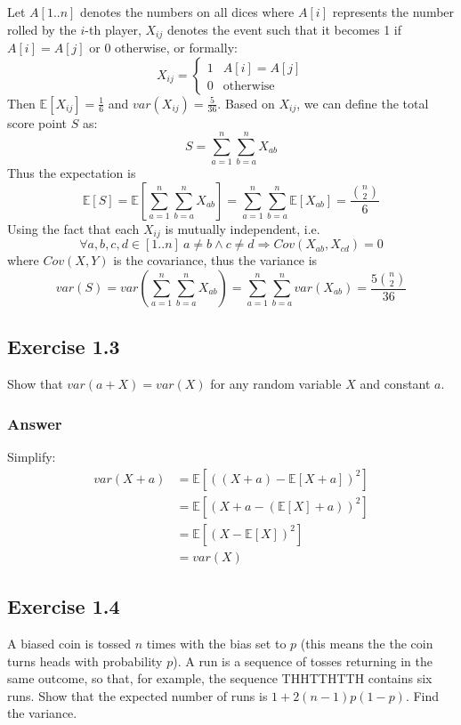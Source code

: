 \documentclass[a4paper]{article}
\newcommand{\Expected}[1]{\mathbb{E}[#1]}
\begin{document}
Let $A[1..n]$ denotes the numbers on all dices where $A[i]$ represents the number rolled by the $i$-th player, $X_{ij}$ denotes the event such that it becomes 1 if $A[i]=A[j]$ or 0 otherwise, or formally:
\[
X_{ij} =
\begin{cases}
1 & A[i] = A[j] \\
0 & \text{otherwise}
\end{cases}
\]
Then $\Expected{X_{ij}}=\frac{1}{6}$ and $var(X_{ij}) = \frac{5}{36}$. Based on $X_{ij}$, we can define the total score point $S$ as:
$$S = \sum_{a=1}^{n}\sum_{b=a}^{n}X_{ab}$$
Thus the expectation is
$$\Expected{S} = \Expected{\sum_{a=1}^{n}\sum_{b=a}^{n}X_{ab}} = \sum_{a=1}^{n}\sum_{b=a}^{n}\Expected{X_{ab}} = \frac{\binom{n}{2}}{6}$$
Using the fact that each $X_{ij}$ is mutually independent, i.e.
$$\forall a,b,c,d \in [1..n]\ a \neq b \wedge c \neq d \Rightarrow Cov(X_{ab}, X_{cd}) = 0$$
where $Cov(X, Y)$ is the covariance, thus the variance is
$$var(S) = var(\sum_{a=1}^{n}\sum_{b=a}^{n}X_{ab}) = \sum_{a=1}^{n}\sum_{b=a}^{n}var(X_{ab}) = \frac{5\binom{n}{2}}{36}$$

\subsection{Exercise 1.3}

Show that $var(a+X) = var(X)$ for any random variable $X$ and constant $a$.

\subsubsection{Answer}

Simplify:
\begin{equation*}
\begin{split}
var(X+a) & = \Expected{((X+a)-\Expected{X+a})^2} \\
& = \Expected{(X+a-(\Expected{X}+a))^2} \\
& = \Expected{(X-\Expected{X})^2} \\
& = var(X)
\end{split}
\end{equation*}

\subsection{Exercise 1.4}

A biased coin is tossed $n$ times with the bias set to $p$ (this means the the coin turns heads with probability $p$). A run is a sequence of tosses returning in the same outcome, so that, for example, the sequence THHTTHTTH contains six runs. Show that the expected number of runs is $1+2(n-1)p(1-p)$. Find the variance.
\end{document}
